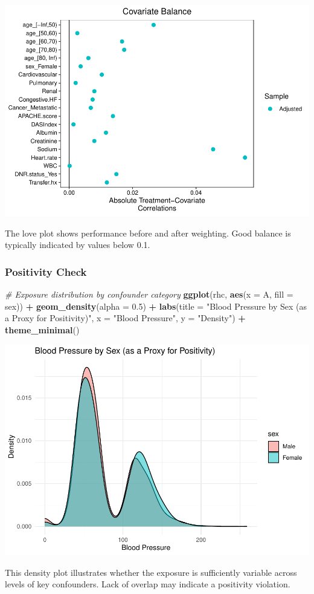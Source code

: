 \documentclass[
]{article}
\newenvironment{Shaded}{\begin{snugshade}}{\end{snugshade}}
\newcommand{\AttributeTok}[1]{\textcolor[rgb]{0.13,0.29,0.53}{#1}}
\newcommand{\CommentTok}[1]{\textcolor[rgb]{0.56,0.35,0.01}{\textit{#1}}}
\newcommand{\FloatTok}[1]{\textcolor[rgb]{0.00,0.00,0.81}{#1}}
\newcommand{\FunctionTok}[1]{\textcolor[rgb]{0.13,0.29,0.53}{\textbf{#1}}}
\newcommand{\NormalTok}[1]{#1}
\newcommand{\SpecialCharTok}[1]{\textcolor[rgb]{0.81,0.36,0.00}{\textbf{#1}}}
\newcommand{\StringTok}[1]{\textcolor[rgb]{0.31,0.60,0.02}{#1}}
\begin{document}
\includegraphics{rhc_analysis_files/figure-latex/covariate-balance-1.pdf}

The love plot shows performance before and after weighting. Good balance
is typically indicated by values below 0.1.

\subsubsection{Positivity Check}\label{positivity-check}

\begin{Shaded}
\begin{Highlighting}[]
\CommentTok{\# Exposure distribution by confounder category}
\FunctionTok{ggplot}\NormalTok{(rhc, }\FunctionTok{aes}\NormalTok{(}\AttributeTok{x =}\NormalTok{ A, }\AttributeTok{fill =}\NormalTok{ sex)) }\SpecialCharTok{+}
  \FunctionTok{geom\_density}\NormalTok{(}\AttributeTok{alpha =} \FloatTok{0.5}\NormalTok{) }\SpecialCharTok{+}
  \FunctionTok{labs}\NormalTok{(}\AttributeTok{title =} \StringTok{"Blood Pressure by Sex (as a Proxy for Positivity)"}\NormalTok{, }\AttributeTok{x =} \StringTok{"Blood Pressure"}\NormalTok{, }\AttributeTok{y =} \StringTok{"Density"}\NormalTok{) }\SpecialCharTok{+}
  \FunctionTok{theme\_minimal}\NormalTok{()}
\end{Highlighting}
\end{Shaded}

\includegraphics{rhc_analysis_files/figure-latex/positivity-check-1.pdf}

This density plot illustrates whether the exposure is sufficiently
variable across levels of key confounders. Lack of overlap may indicate
a positivity violation.
\end{document}
